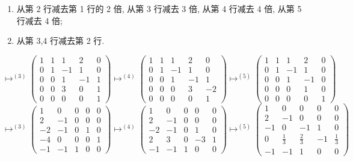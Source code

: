 \begin{enumerate}
\item[(1)] 从第 2 行减去第 1 行的 2 倍, 从第 3 行减去 3 倍, 从第 4 行减去 4 倍, 从第 5 行减去
4 倍;
\item[(2)] 从第 3,4 行减去第 2 行.
\end{enumerate}
\[
\longmapsto^{(3)} \begin{pmatrix} 1 & 1 & 1 & 2 & 0 \\ 0 & 1 & -1 & 1 & 0 \\ 0 & 0 & 1 & -1 & 1 \\ 0 & 0 & 3 & 0 & 1 \\ 0 & 0 & 0 & 0 & 1 \end{pmatrix}
\longmapsto^{(4)} \begin{pmatrix} 1 & 1 & 1 & 2 & 0 \\ 0 & 1 & -1 & 1 & 0 \\ 0 & 0 & 1 & -1 & 1 \\ 0 & 0 & 0 & 3 & -2 \\ 0 & 0 & 0 & 0 & 1 \end{pmatrix}
\longmapsto^{(5)} \begin{pmatrix} 1 & 1 & 1 & 2 & 0 \\ 0 & 1 & -1 & 1 & 0 \\ 0 & 0 & 1 & -1 & 0 \\ 0 & 0 & 0 & 1 & 0 \\ 0 & 0 & 0 & 0 & 1 \end{pmatrix}
\]
\[
\longmapsto^{(3)} \begin{pmatrix} 1 & 0 & 0 & 0 & 0 \\ 2 & -1 & 0 & 0 & 0 \\ -2 & -1 & 0 & 1 & 0 \\ -4 & 0 & 0 & 0 & 1 \\ -1 & -1 & 1 & 0 & 0 \end{pmatrix}
\longmapsto^{(4)} \begin{pmatrix} 1 & 0 & 0 & 0 & 0 \\ 2 & -1 & 0 & 0 & 0 \\ -2 & -1 & 0 & 1 & 0 \\ 2 & 3 & 0 & -3 & 1 \\ -1 & -1 & 1 & 0 & 0 \end{pmatrix}
\longmapsto^{(5)} \begin{pmatrix} 1 & 0 & 0 & 0 & 0 \\ 2 & -1 & 0 & 0 & 0 \\ -1 & 0 & -1 & 1 & 0 \\ 0 & \frac{1}{3} & \frac{2}{3} & -1 & \frac{1}{3} \\ -1 & -1 & 1 & 0 & 0 \end{pmatrix}
\]
